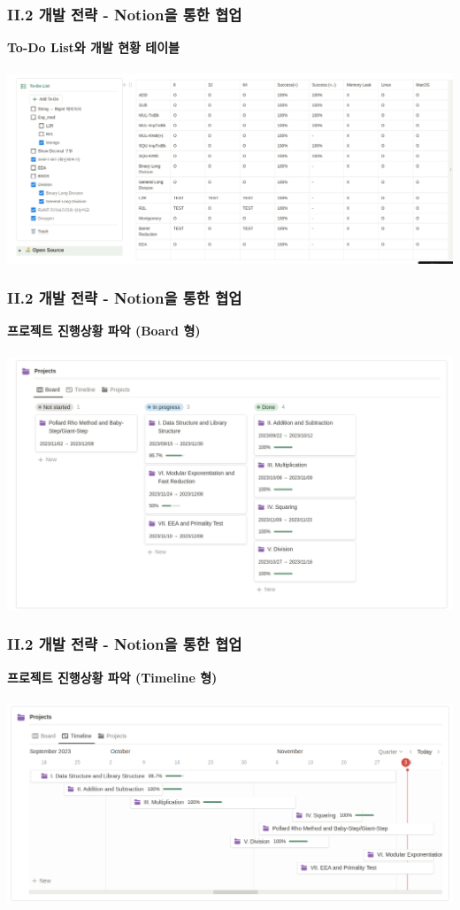 \documentclass{beamer}
\begin{document}
\begin{frame}
	\frametitle{II.2 개발 전략 - Notion을 통한 협업}
	\alert{\bf To-Do List와 개발 현황 테이블}\\
	\ \\
	\includegraphics[width=\linewidth,height=.825\textheight]{notion2.png}\\
\end{frame}
\begin{frame}
	\frametitle{II.2 개발 전략 - Notion을 통한 협업}
	\alert{\bf 프로젝트 진행상황 파악 (Board 형)}\\
	\ \\
	\includegraphics[width=\linewidth,height=.825\textheight]{notion3.png}\\
\end{frame}

\begin{frame}
	\frametitle{II.2 개발 전략 - Notion을 통한 협업}
	\alert{\bf 프로젝트 진행상황 파악 (Timeline 형)}\\
	\ \\
	\includegraphics[width=\linewidth,height=.825\textheight]{notion4.png}\\
\end{frame}
\end{document}
